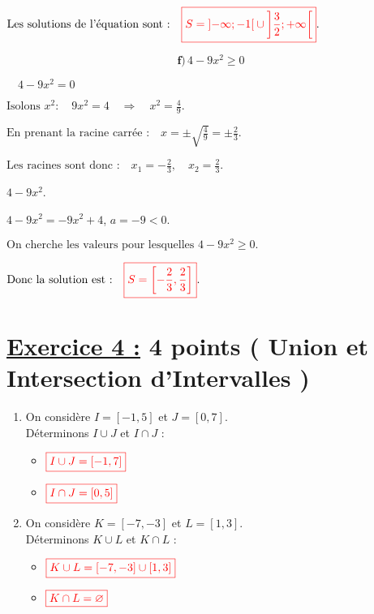\documentclass[12pt,a4paper]{article}
\begin{document}
\(
\text{Les solutions de l'équation sont :} \quad
\textcolor{red}{\boxed{S=\left]-\infty;-1 \right[ \cup\left] \frac{3}{2};+\infty \right[ }}.
\)

\[
\textbf{f)} \, 4 - 9x^2 \geq 0
\]

 \( \quad 4 - 9x^2 = 0 \)

\(
\text{Isolons } x^2 : \quad 9x^2 = 4 \quad \Rightarrow \quad x^2 = \frac{4}{9}.
\)

\(
\text{En prenant la racine carrée :} \quad x = \pm \sqrt{\frac{4}{9}} = \pm \frac{2}{3}.
\)

\(
\text{Les racines sont donc :} \quad x_1 = -\frac{2}{3}, \quad x_2 = \frac{2}{3}.
\)

 \( 4 - 9x^2 \).

 \( 4 - 9x^2 = -9x^2 + 4 \),  \( a = -9 < 0 \).



\(
\text{On cherche les valeurs pour lesquelles } 4 - 9x^2 \geq 0.
\)

\(
\text{Donc la solution est :} \quad
\textcolor{red}{\boxed{S = \left[-\frac{2}{3}, \frac{2}{3} \right]}}.
\)


\section*{\underline{Exercice 4 :} 4 points ( Union et Intersection d'Intervalles )}  

\begin{enumerate}  
    \item On considère \( I = [-1, 5] \) et \( J = [0, 7] \).\\
    Déterminons \( I \cup J \) et \( I \cap J \) :
    \begin{itemize}
        \item \(\textcolor{red}{\boxed{ I \cup J = [-1, 7]}} \)
        \item \(\textcolor{red}{\boxed{ I \cap J = [0, 5]}} \)
    \end{itemize}

    \item On considère \( K = [-7, -3] \) et \( L = [1, 3] \).\\
    Déterminons \( K \cup L \)  et \( K \cap L \) :
    \begin{itemize}
        \item  \(\textcolor{red}{\boxed{ K \cup L = [-7, -3]\cup[1, 3]}}  \)
        \item \(\textcolor{red}{\boxed{K \cap L = \varnothing}}
        \)
    \end{itemize}
\end{enumerate}
\end{document}
